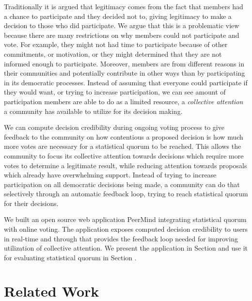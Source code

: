 \documentclass[chi_draft]{sigchi}
\newcommand\secref[1]{\textit{\nameref{#1}}}
\begin{document}
Traditionally it is argued that legitimacy comes from the fact that members had a chance to participate
and they decided not to, giving legitimacy to make a decision to those who did participate.
We argue that this is a problematic view because there are many restrictions on why members could not
participate and vote.
For example, they might not had time to participate because of other commitments, or motivation, or they might determined
that they are not informed enough to participate.
Moreover, members are from different reasons in their communities and potentially contribute in other ways
than by participating in its democratic processes.
Instead of assuming that everyone could participate if they would want, or trying to increase participation,
we can see amount of participation members are able to do as a limited resource, a \emph{collective attention}
a community has available to utilize for its decision making.

We can compute decision credibility during ongoing voting process to give feedback to the community
on how contentious a proposed decision is how much more votes are necessary for a statistical quorum
to be reached.
This allows the community to focus its collective attention towards decisions which require more votes
to determine a legitimate result, while reducing attention towards proposals which already have overwhelming support.
Instead of trying to increase participation on all democratic decisions being made, a community can
do that selectively through an automatic feedback loop, trying to reach statistical quorum for their decisions.

We built an open source web application PeerMind integrating statistical quorum with online voting.
The application exposes computed decision credibility to users in real-time and through that provides
the feedback loop needed for improving utilization of collective attention.
We present the application in Section \secref{sec:peermind} and use it for evaluating statistical quorum in
Section \secref{sec:evaluation}.



\section{Related Work}
\end{document}
